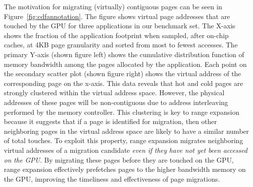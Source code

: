The motivation for migrating (virtually) contiguous pages can be seen in
Figure~\ref{fig:cdfannotation}. The figure shows virtual page addresses that are
touched by the GPU for three applications in our benchmark set.
The X-axis shows the fraction of the application footprint when
sampled, after on-chip caches, at 4KB page granularity and sorted from
{\color{black}most to fewest accesses.
The primary Y-axis (shown figure left) shows the cumulative distribution
function of memory bandwidth among the pages allocated by the application.
Each point on the secondary scatter
plot (shown figure right) shows the virtual address of the corresponding page on
the x-axis. This data reveals that hot and cold pages are strongly clustered within the
virtual address space.  However, the physical addresses of these pages will be
non-contiguous due to address interleaving performed by the memory controller.
} This clustering
is key to range expansion because it suggests that if a page is identified for migration, then other 
neighboring pages in the virtual address space are likely to have a similar number of total touches.  
To exploit this property,
range expansion migrates neighboring virtual addresses of a migration candidate \emph{even if they
have not yet been accessed on the GPU}\@.  By migrating these pages before they are touched on the GPU, range
expansion effectively prefetches pages to the higher bandwidth memory on the GPU, 
improving the timeliness and effectiveness of page migrations.  

